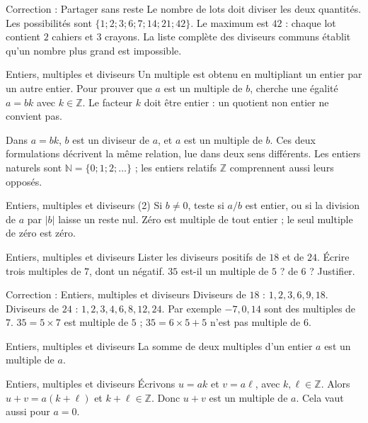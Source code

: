\documentclass[aspectratio=169,10pt]{beamer}
\providecommand{\N}{\mathbb{N}}
\providecommand{\Z}{\mathbb{Z}}
\begin{document}
\begin{frame}{Correction : Partager sans reste}
Le nombre de lots doit diviser les deux quantités. Les possibilités sont \(\{1;2;3;6;7;14;21;42\}\). Le maximum est \(42\) : chaque lot contient \(2\) cahiers et \(3\) crayons. La liste complète des diviseurs communs établit qu’un nombre plus grand est impossible.
\end{frame}
\begin{frame}{Entiers, multiples et diviseurs}
Un multiple est obtenu en multipliant un entier par un autre entier. Pour prouver que \(a\) est un multiple de \(b\), cherche une égalité \(a=bk\) avec \(k\in\Z\). Le facteur \(k\) doit être entier : un quotient non entier ne convient pas.

Dans \(a=bk\), \(b\) est un diviseur de \(a\), et \(a\) est un multiple de \(b\). Ces deux formulations décrivent la même relation, lue dans deux sens différents. Les entiers naturels sont \(\N=\{0;1;2;\ldots\}\) ; les entiers relatifs \(\Z\) comprennent aussi leurs opposés.
\end{frame}
\begin{frame}{Entiers, multiples et diviseurs (2)}
Si \(b\ne0\), teste si \(a/b\) est entier, ou si la division de \(a\) par \(|b|\) laisse un reste nul. Zéro est multiple de tout entier ; le seul multiple de zéro est zéro.
\end{frame}
\begin{frame}{Entiers, multiples et diviseurs}
Lister les diviseurs positifs de \(18\) et de \(24\). Écrire trois multiples de \(7\), dont un négatif. \(35\) est-il un multiple de \(5\) ? de \(6\) ? Justifier.
\end{frame}
\begin{frame}{Correction : Entiers, multiples et diviseurs}
Diviseurs de \(18\) : \(1,2,3,6,9,18\). Diviseurs de \(24\) : \(1,2,3,4,6,8,12,24\). Par exemple \(-7,0,14\) sont des multiples de \(7\). \(35=5\times7\) est multiple de \(5\) ; \(35=6\times5+5\) n'est pas multiple de \(6\).
\end{frame}
\begin{frame}{Entiers, multiples et diviseurs}
La somme de deux multiples d'un entier \(a\) est un multiple de \(a\).
\end{frame}
\begin{frame}{Entiers, multiples et diviseurs}
Écrivons \(u=ak\) et \(v=a\ell\), avec \(k,\ell\in\Z\). Alors \(u+v=a(k+\ell)\) et \(k+\ell\in\Z\). Donc \(u+v\) est un multiple de \(a\). Cela vaut aussi pour \(a=0\).
\end{frame}
\end{document}
